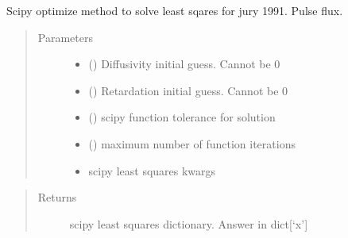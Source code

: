 \documentclass[letterpaper,10pt,english]{sphinxmanual}
\begin{document}
\begin{fulllineitems}
\begin{fulllineitems}
\begin{quote}
\begin{description}
\begin{itemize}
\end{itemize}

\end{description}\end{quote}

\end{fulllineitems}


\begin{fulllineitems}
\label{\detokenize{index:lb_colloids.Colloids.Colloid_output.ADE.solve_jury_1991}}
Scipy optimize method to solve least sqares
for jury 1991. Pulse flux.
\begin{quote}\begin{description}
\item[{Parameters}] \leavevmode\begin{itemize}
\item {} 
 () \textendash{} Diffusivity initial guess. Cannot be 0

\item {} 
 () \textendash{} Retardation initial guess. Cannot be 0

\item {} 
 () \textendash{} scipy function tolerance for solution

\item {} 
 () \textendash{} maximum number of function iterations

\item {} 
 \textendash{} 
scipy least squares kwargs


\end{itemize}

\end{description}\end{quote}
\begin{quote}\begin{description}
\item[{Returns}] \leavevmode
scipy least squares dictionary. Answer in dict{[}‘x’{]}

\end{description}\end{quote}


\end{fulllineitems}
\end{fulllineitems}
\end{document}
